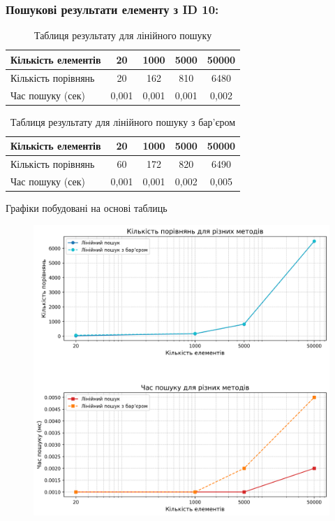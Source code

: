 \clearpage
\subsubsection{Пошукові результати елементу з ID 10:}
\begin{table}[htbp]
\caption{Таблиця результату для лінійного пошуку}
\begin{tabular}{|l|c|c|c|c|}
\hline
Кількість елементів & 20    & 1000  & 5000  & 50000 \\ \hline
Кількість порівнянь & 20    & 162   & 810   & 6480  \\ \hline
Час пошуку (сек)    & 0,001 & 0,001 & 0,001 & 0,002 \\ \hline
\end{tabular}
\end{table}

\vspace{-10pt} 


\begin{table}[htbp]
\caption{Таблиця результату для лінійного пошуку з бар’єром}
\begin{tabular}{|l|c|c|c|c|}
\hline
Кількість елементів & 20    & 1000  & 5000  & 50000 \\ \hline
Кількість порівнянь & 60    & 172   & 820   & 6490  \\ \hline
Час пошуку (сек)    & 0,001 & 0,001 & 0,002 & 0,005 \\ \hline
\end{tabular}
\end{table}

Графіки побудовані на основі таблиць
\begin{figure}[h!]
  \centering
  \includegraphics[width=15cm]{reports/algos/lab10/assets/plot.png}
\end{figure}



